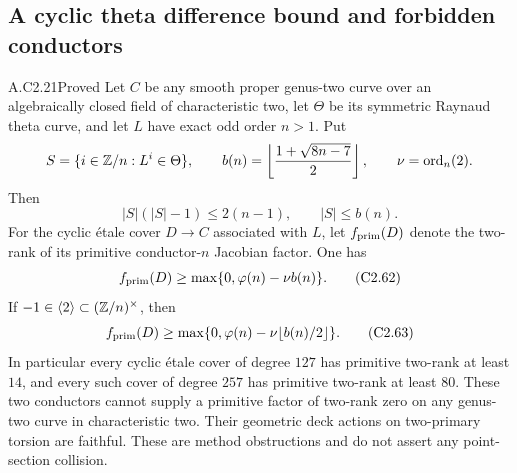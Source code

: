 \subsection{A cyclic theta difference bound and forbidden conductors}

\begin{claim}{A.C2.21}{Proved}
Let $C$ be any smooth proper genus-two curve over
an algebraically closed field of characteristic two,
let $\Theta$ be its symmetric Raynaud theta curve,
and let $L$ have exact odd order $n>1$. Put
\[
 S=\{i\in\mathbb Z/n:L^i\in\Theta\},\qquad
 b(n)=\left\lfloor\frac{1+\sqrt{8n-7}}2\right\rfloor,
 \qquad \nu=\operatorname{ord}_n(2).
\]
Then
\[
                  |S|(|S|-1)\le2(n-1),\qquad |S|\le b(n).
                                                               \tag{C2.61}
\]
For the cyclic \'etale cover $D\to C$ associated with $L$,
let $f_{\rm prim}(D)$ denote the two-rank of its
primitive conductor-$n$ Jacobian factor. One has
\[
          f_{\rm prim}(D)\ge
                    \max\{0,\varphi(n)-\nu b(n)\}.             \tag{C2.62}
\]
If $-1\in\langle2\rangle\subset(\mathbb Z/n)^\times$, then
\[
          f_{\rm prim}(D)\ge
              \max\{0,\varphi(n)-\nu\lfloor b(n)/2\rfloor\}.
                                                               \tag{C2.63}
\]
In particular every cyclic \'etale cover of degree $127$
has primitive two-rank at least $14$, and every such
cover of degree $257$ has primitive two-rank at least
$80$. These two conductors cannot supply a primitive
factor of two-rank zero on any genus-two curve in
characteristic two. Their geometric deck actions on
two-primary torsion are faithful. These are method
obstructions and do not assert any point-section collision.
\end{claim}
